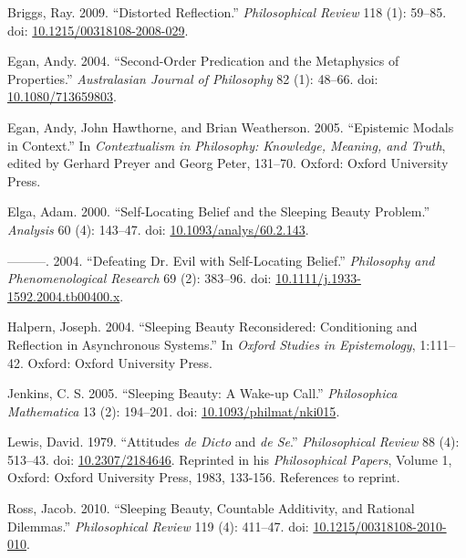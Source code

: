 \documentclass[
  10pt,
  letterpaper,
  DIV=11,
  numbers=noendperiod,
  twoside]{scrartcl}
\newlength{\cslhangindent}
\newenvironment{CSLReferences}[2] %
 {\begin{list}{}{%
  \setlength{\itemindent}{0pt}
  \setlength{\leftmargin}{0pt}
  \setlength{\parsep}{0pt}
  \ifodd #1
   \setlength{\leftmargin}{\cslhangindent}
   \setlength{\itemindent}{-1\cslhangindent}
  \fi
  \setlength{\itemsep}{#2\baselineskip}}}
 {\end{list}}
\begin{document}
\label{refs}
\begin{CSLReferences}{1}{0}
Briggs, Ray. 2009. {``Distorted Reflection.''} \emph{Philosophical
Review} 118 (1): 59--85. doi:
\href{https://doi.org/10.1215/00318108-2008-029}{10.1215/00318108-2008-029}.

Egan, Andy. 2004. {``Second-Order Predication and the Metaphysics of
Properties.''} \emph{Australasian Journal of Philosophy} 82 (1): 48--66.
doi: \href{https://doi.org/10.1080/713659803}{10.1080/713659803}.

Egan, Andy, John Hawthorne, and Brian Weatherson. 2005. {``{Epistemic
Modals in Context}.''} In \emph{Contextualism in Philosophy: Knowledge,
Meaning, and Truth}, edited by Gerhard Preyer and Georg Peter, 131--70.
Oxford: Oxford University Press.

Elga, Adam. 2000. {``Self-Locating Belief and the Sleeping Beauty
Problem.''} \emph{Analysis} 60 (4): 143--47. doi:
\href{https://doi.org/10.1093/analys/60.2.143}{10.1093/analys/60.2.143}.

---------. 2004. {``Defeating Dr. Evil with Self-Locating Belief.''}
\emph{Philosophy and Phenomenological Research} 69 (2): 383--96. doi:
\href{https://doi.org/10.1111/j.1933-1592.2004.tb00400.x}{10.1111/j.1933-1592.2004.tb00400.x}.

Halpern, Joseph. 2004. {``Sleeping Beauty Reconsidered: Conditioning and
Reflection in Asynchronous Systems.''} In \emph{Oxford Studies in
Epistemology}, 1:111--42. Oxford: Oxford University Press.

Jenkins, C. S. 2005. {``Sleeping Beauty: A Wake-up Call.''}
\emph{Philosophica Mathematica} 13 (2): 194--201. doi:
\href{https://doi.org/10.1093/philmat/nki015}{10.1093/philmat/nki015}.

Lewis, David. 1979. {``Attitudes \emph{de Dicto} and \emph{de Se}.''}
\emph{Philosophical Review} 88 (4): 513--43. doi:
\href{https://doi.org/10.2307/2184646}{10.2307/2184646}. Reprinted in
his \emph{Philosophical Papers}, Volume 1, Oxford: Oxford University
Press, 1983, 133-156. References to reprint.

Ross, Jacob. 2010. {``Sleeping Beauty, Countable Additivity, and
Rational Dilemmas.''} \emph{Philosophical Review} 119 (4): 411--47. doi:
\href{https://doi.org/10.1215/00318108-2010-010}{10.1215/00318108-2010-010}.


\end{CSLReferences}
\end{document}
